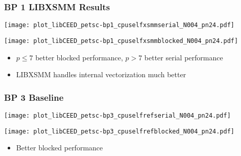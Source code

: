 \documentclass{beamer}
\begin{document}

\begin{frame}
\begin{center}
\frametitle{BP 1 LIBXSMM Results}

\begin{multicols}{2}

\begin{flushleft}
\texttt{[image: plot\_libCEED\_petsc-bp1\_cpuselfxsmmserial\_N004\_pn24.pdf]}
\end{flushleft}

\begin{flushright}
\texttt{[image: plot\_libCEED\_petsc-bp1\_cpuselfxsmmblocked\_N004\_pn24.pdf]}
\end{flushright}

\end{multicols}

\vspace{-0.5cm}

\begin{itemize}

\item $p \leq 7$ better blocked performance, $p > 7$ better serial performance

\item LIBXSMM handles internal vectorization much better

\end{itemize}

\end{center}
\end{frame}


\begin{frame}
\begin{center}
\frametitle{BP 3 Baseline}

\begin{multicols}{2}

\begin{flushleft}
\texttt{[image: plot\_libCEED\_petsc-bp3\_cpuselfrefserial\_N004\_pn24.pdf]}
\end{flushleft}

\begin{flushright}
\texttt{[image: plot\_libCEED\_petsc-bp3\_cpuselfrefblocked\_N004\_pn24.pdf]}
\end{flushright}

\end{multicols}

\vspace{-0.15cm}

\begin{itemize}

\item Better blocked performance

\end{itemize}

\end{center}
\end{frame}
\end{document}
